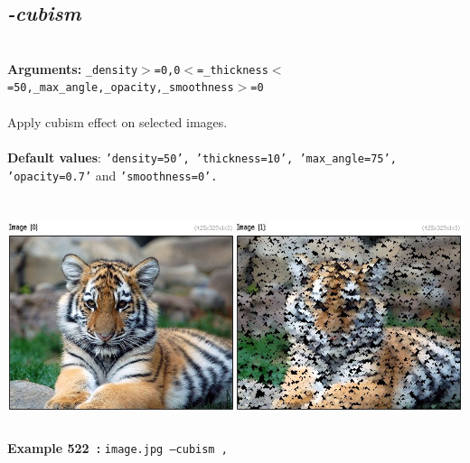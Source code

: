 \documentclass[a4paper,11pt,twoside]{book}
\begin{document}
\subsection{\emph{-cubism} }\vspace*{-0.5em}
~\\\textbf{Arguments: } 
{\small \texttt{\_density$>$=0,0$<$=\_thickness$<$=50,\_max\_angle,\_opacity,\_smoothness$>$=0}}\\~\\
Apply cubism effect on selected images.
~\\~\\\textbf{Default values}: {\small \texttt{'density=50', 'thickness=10', 'max\_angle=75', 'opacity=0.7'} and \texttt{'smoothness=0'.}}
\begin{center}\includegraphics[keepaspectratio=true,height=7cm,width=\textwidth]{img/gmic_def522.jpg}\\
{\footnotesize \textbf{Example 522~:} \texttt{image.jpg --cubism ,}}
\end{center}
\end{document}
